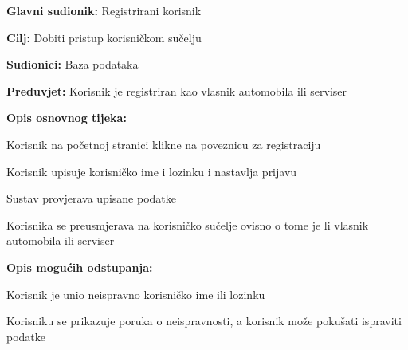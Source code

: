 					\noindent {}
					\begin{packed_item}
	
						\item \textbf{Glavni sudionik: } Registrirani korisnik
						\item  \textbf{Cilj:} Dobiti pristup korisničkom sučelju
						\item  \textbf{Sudionici:} Baza podataka
						\item  \textbf{Preduvjet:} Korisnik je registriran kao vlasnik automobila ili serviser
						\item  \textbf{Opis osnovnog tijeka:}
						
						\item[] \begin{packed_enum}
	
							\item Korisnik na početnoj stranici klikne na poveznicu za registraciju
							\item Korisnik upisuje korisničko ime i lozinku i nastavlja prijavu
							\item Sustav provjerava upisane podatke
							\item Korisnika se preusmjerava na korisničko sučelje ovisno o tome je li vlasnik automobila ili serviser
						\end{packed_enum}
						
						\item  \textbf{Opis mogućih odstupanja:}
						
						\item[] \begin{packed_item}
	
							\item[3.a] Korisnik je unio neispravno korisničko ime ili lozinku
							\item[] \begin{packed_enum}
								
								\item Korisniku se prikazuje poruka o neispravnosti, a korisnik može pokušati ispraviti podatke
								
							\end{packed_enum}
							
						\end{packed_item}
					\end{packed_item}
				
